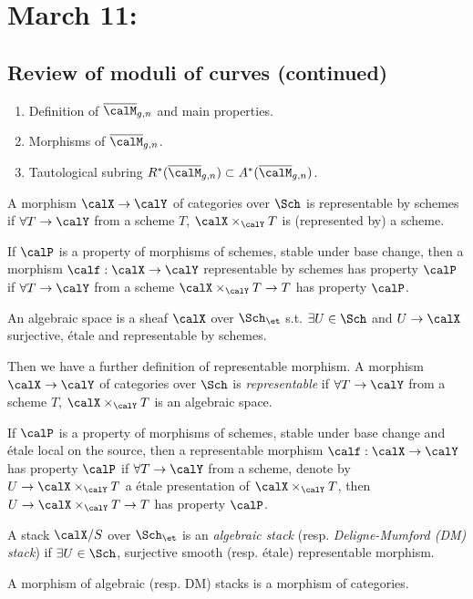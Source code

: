 \section{March 11:}

\subsection{Review of moduli of curves (continued)}

  \begin{enumerate}[label=(\arabic*)]
    \item Definition of $\overline{\calM}_{g,n}$ and main properties.
    \item Morphisms of $\overline{\calM}_{g,n}$.
    \item Tautological subring $R^*(\overline{\calM}_{g,n}) \subset A^*(\overline{\calM}_{g,n})$.
  \end{enumerate}

  A morphism $\calX \to \calY$ of categories over $\Sch$ is representable by schemes if 
  $\forall T \to \calY$ from a scheme $T$, $\calX \times_\calY T$ is (represented by) a scheme.

  If $\calP$ is a property of morphisms of schemes, stable under base change, 
  then a morphism $\calf: \calX \to \calY$ representable by schemes has property $\calP$ if 
  $\forall T \to \calY$ from a scheme $\calX \times_\calY T \to T$ has property $\calP$.

  An algebraic space is a sheaf $\calX$ over $\Sch_{\et}$ s.t. $\exists U \in \Sch$ and $U \to \calX$ surjective, \'etale and representable by schemes.

  Then we have a further definition of representable morphism.
  A morphism $\calX \to \calY$ of categories over $\Sch$ is \emph{representable} if 
  $\forall T \to \calY$ from a scheme $T$, $\calX \times_\calY T$ is an algebraic space.

  If $\calP$ is a property of morphisms of schemes, stable under base change and \'etale local on the source,
  then a representable morphism $\calf: \calX \to \calY$ has property $\calP$ if 
  $\forall T \to \calY$ from a scheme, denote by $U \to \calX \times_\calY T$ a \'etale presentation of $\calX \times_\calY T$, then $U \to \calX \times_\calY T \to T$ has property $\calP$.

  \begin{definition}
    A stack $\calX/S$ over $\Sch_\et$ is an \emph{algebraic stack} (resp. \emph{Deligne-Mumford (DM) stack}) if $\exists U \in \Sch$, surjective smooth (resp. \'etale) representable morphism.

    A morphism of algebraic (resp. DM) stacks is a morphism of categories.
  \end{definition}


